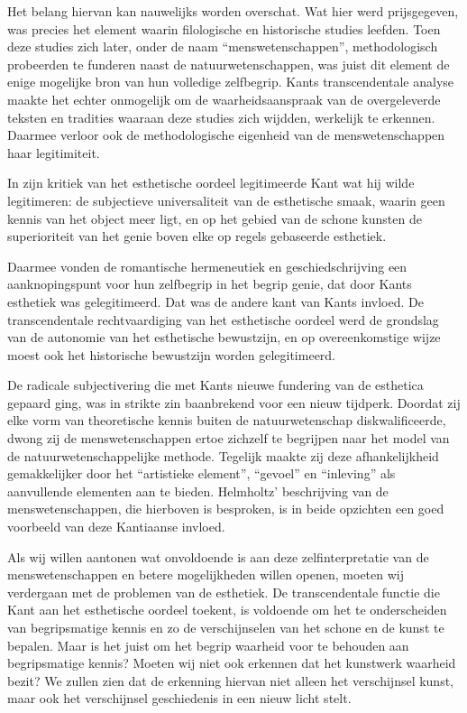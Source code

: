 Het belang hiervan kan nauwelijks worden overschat. Wat hier werd prijsgegeven, was precies het element waarin filologische en historische studies leefden. Toen deze studies zich later, onder de naam ``menswetenschappen'', methodologisch probeerden te funderen naast de natuurwetenschappen, was juist dit element de enige mogelijke bron van hun volledige zelfbegrip. Kants transcendentale analyse maakte het echter onmogelijk om de waarheidsaanspraak van de overgeleverde teksten en tradities waaraan deze studies zich wijdden, werkelijk te erkennen. Daarmee verloor ook de methodologische eigenheid van de menswetenschappen haar legitimiteit.

In zijn kritiek van het esthetische oordeel legitimeerde Kant wat hij wilde legitimeren: de subjectieve universaliteit van de esthetische smaak, waarin geen kennis van het object meer ligt, en op het gebied van de schone kunsten de superioriteit van het genie boven elke op regels gebaseerde esthetiek.

Daarmee vonden de romantische hermeneutiek en geschiedschrijving een aanknopingspunt voor hun zelfbegrip in het begrip genie, dat door Kants esthetiek was gelegitimeerd. Dat was de andere kant van Kants invloed. De transcendentale rechtvaardiging van het esthetische oordeel werd de grondslag van de autonomie van het esthetische bewustzijn, en op overeenkomstige wijze moest ook het historische bewustzijn worden gelegitimeerd.

De radicale subjectivering die met Kants nieuwe fundering van de esthetica gepaard ging, was in strikte zin baanbrekend voor een nieuw tijdperk. Doordat zij elke vorm van theoretische kennis buiten de natuurwetenschap diskwalificeerde, dwong zij de menswetenschappen ertoe zichzelf te begrijpen naar het model van de natuurwetenschappelijke methode. Tegelijk maakte zij deze afhankelijkheid gemakkelijker door het ``artistieke element'', ``gevoel'' en ``inleving'' als aanvullende elementen aan te bieden. Helmholtz' beschrijving van de menswetenschappen, die hierboven is besproken, is in beide opzichten een goed voorbeeld van deze Kantiaanse invloed.

Als wij willen aantonen wat onvoldoende is aan deze zelfinterpretatie van de menswetenschappen en betere mogelijkheden willen openen, moeten wij verdergaan met de problemen van de esthetiek. De transcendentale functie die Kant aan het esthetische oordeel toekent, is voldoende om het te onderscheiden van begripsmatige kennis en zo de verschijnselen van het schone en de kunst te bepalen. Maar is het juist om het begrip waarheid voor te behouden aan begripsmatige kennis? Moeten wij niet ook erkennen dat het kunstwerk waarheid bezit? We zullen zien dat de erkenning hiervan niet alleen het verschijnsel kunst, maar ook het verschijnsel geschiedenis in een nieuw licht stelt.



